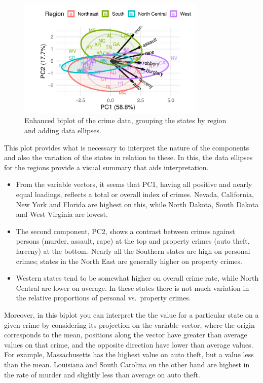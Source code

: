 \documentclass[
  letterpaper,
  10pt,
  krantz2]{krantz}
\begin{document}
\begin{figure}[H]

{\centering \includegraphics[width=0.8\textwidth,height=\textheight]{figs/ch04/fig-crime-biplot2-1.pdf}

}

\caption{\label{fig-crime-biplot2}Enhanced biplot of the crime data,
grouping the states by region and adding data ellipses.}

\end{figure}

This plot provides what is necessary to interpret the nature of the
components and also the variation of the states in relation to these. In
this, the data ellipses for the regions provide a visual summary that
aids interpretation.

\begin{itemize}
\item
  From the variable vectors, it seems that PC1, having all positive and
  nearly equal loadings, reflects a total or overall index of crimes.
  Nevada, California, New York and Florida are highest on this, while
  North Dakota, South Dakota and West Virginia are lowest.
\item
  The second component, PC2, shows a contrast between crimes against
  persons (murder, assault, rape) at the top and property crimes (auto
  theft, larceny) at the bottom. Nearly all the Southern states are high
  on personal crimes; states in the North East are generally higher on
  property crimes.
\item
  Western states tend to be somewhat higher on overall crime rate, while
  North Central are lower on average. In these states there is not much
  variation in the relative proportions of personal vs.~property crimes.
\end{itemize}

Moreover, in this biplot you can interpret the the value for a
particular state on a given crime by considering its projection on the
variable vector, where the origin corresponds to the mean, positions
along the vector have greater than average values on that crime, and the
opposite direction have lower than average values. For example,
Massachusetts has the highest value on auto theft, but a value less than
the mean. Louisiana and South Carolina on the other hand are highest in
the rate of murder and slightly less than average on auto theft.
\end{document}
